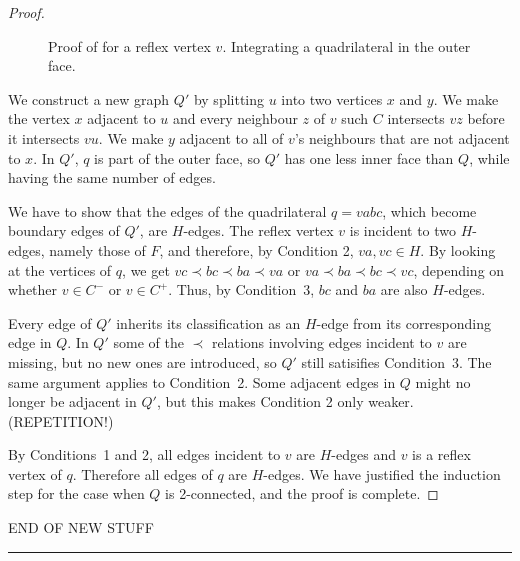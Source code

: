 \begin{proof}
  \begin{figure}
     \caption{Proof of  for a reflex
       vertex $v$. Integrating a quadrilateral in the outer face.}
  \end{figure}
   

   We construct a new graph $Q'$ by splitting $u$ into two vertices $x$
   and $y$.  We make the vertex $x$ adjacent to $u$ and every neighbour
   $z$ of $v$ such $C$ intersects $vz$ before it intersects $vu$.  We make
   $y$ adjacent to all of $v$'s neighbours that are not adjacent to $x$.
   In $Q'$, $q$ is part of the outer face, so $Q'$ has one less inner
   face than $Q$, while having the same number of edges.

We have to show that the edges of the quadrilateral 
$q=vabc$,
which become boundary edges of $Q'$, are $H$-edges.
The reflex vertex $v$ is incident to two $H$-edges, namely those of
$F$, and therefore, by Condition 2, $va,vc\in H$.
By looking at the vertices of $q$, we get
$vc \prec bc\prec ba\prec va$ or 
$va \prec ba\prec bc\prec vc$,
 depending on whether $v\in C^-$ or
$v\in C^+$. 
Thus, by Condition~3, $bc$ and $ba$ are also $H$-edges.

Every edge of $Q'$ inherits its classification as an $H$-edge from
its corresponding edge in $Q$.
   In $Q'$ some of the $\prec$ relations involving edges incident
   to $v$ are missing, but no new ones are introduced, so $Q'$ still
   satisifies Condition~3.
The same argument applies to
Condition~2. Some adjacent edges in $Q$ might no longer be adjacent
in $Q'$, but this makes Condition 2 only weaker. (REPETITION!)


   By Conditions~1 and 2, all edges incident to $v$ are $H$-edges and $v$
   is a reflex vertex of $q$. Therefore all edges of $q$ are $H$-edges.
We have justified the induction step for the case when $Q$ is
2-connected, and
   the proof is complete.
\end{proof}


END OF NEW STUFF
\hrule



